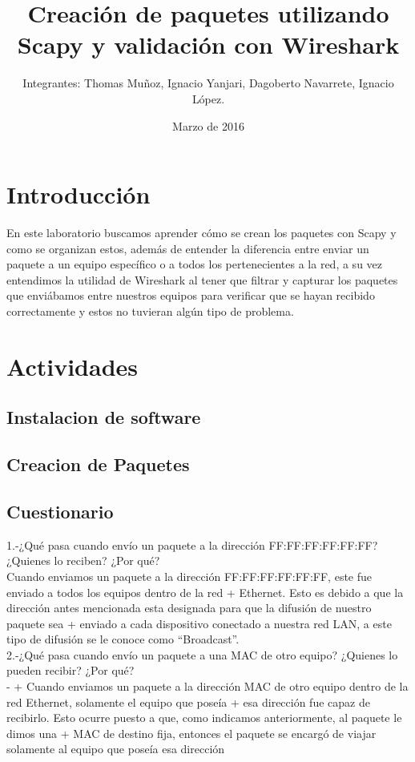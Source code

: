 \documentclass{udpreport}
\title{Creación de paquetes utilizando Scapy y validación con Wireshark}
\author{Integrantes: Thomas Muñoz, Ignacio Yanjari, Dagoberto Navarrete, Ignacio López.}
\date{Marzo de 2016}
\begin{document}
\maketitle
\tableofcontents
\chapter{Introducción}
	En este laboratorio buscamos aprender cómo se crean los paquetes con Scapy y como se organizan estos, además de entender la
	diferencia entre enviar un paquete a un equipo específico o a todos los pertenecientes a la red, a su vez entendimos la
	utilidad de Wireshark al tener que filtrar y capturar los paquetes que enviábamos entre nuestros equipos para verificar que se
	hayan recibido correctamente y estos no tuvieran algún tipo de problema.
\chapter{Actividades}
	\section{Instalacion de software}

	\section{Creacion de Paquetes}
		
	\section{Cuestionario}
	
	  1.-¿Qué pasa cuando envío un paquete a la dirección FF:FF:FF:FF:FF:FF? ¿Quienes
	     lo reciben? ¿Por qué?\\
	  
	     Cuando enviamos un paquete a la dirección FF:FF:FF:FF:FF:FF, este fue enviado a todos los equipos dentro de la red
 +	     Ethernet. Esto es debido a que la dirección antes mencionada esta designada para que la difusión de nuestro paquete sea
 +	     enviado a cada dispositivo conectado a nuestra red LAN, a este tipo de difusión se le conoce como “Broadcast”.\\
 
  	  2.-¿Qué pasa cuando envío un paquete a una MAC de otro equipo? ¿Quienes lo
  	      pueden recibir? ¿Por qué?\\
 -	      
 +	      Cuando enviamos un paquete a la dirección MAC de otro equipo dentro de la red Ethernet, solamente el equipo que poseía
 +	      esa dirección fue capaz de recibirlo. Esto ocurre puesto a que, como indicamos anteriormente, al paquete le dimos una
 +	      MAC de destino fija, entonces el paquete se encargó de viajar solamente al equipo que poseía esa dirección\\
 
\end{document}
